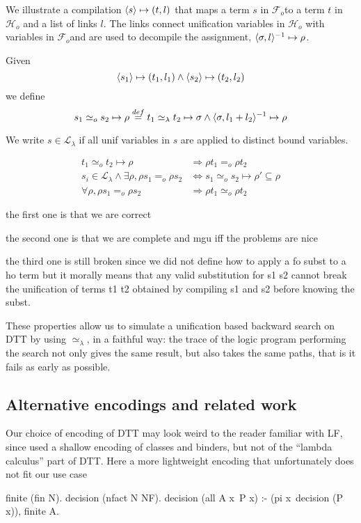 \documentclass[sigconf,natbib=false]{acmart}
\newcommand{\EqualRel}{\ensuremath{=}}
\newcommand{\UnifRel}{\ensuremath{\simeq}}
\newcommand{\Uo}{\ensuremath{\UnifRel_o}\xspace}
\newcommand{\Eo}{\ensuremath{\EqualRel_o}\xspace}
\newcommand{\Ue}{\ensuremath{\UnifRel_\lambda}\xspace}
\newcommand{\Fo}{\ensuremath{\mathcal{F}_{\!o}\xspace}} %
\newcommand{\Ho}{\ensuremath{\mathcal{H}_o}\xspace}
\begin{document}
We illustrate a compilation $\langle s \rangle\mapsto(t,l)$ that
maps a term $s$ in \Fo to a term $t$ in \Ho and a list of links $l$.
The links connect unification variables in \Ho with variables
in \Fo and are used to decompile the assignment,
$\langle \sigma,l \rangle^{-1}\mapsto \rho$.

Given 
$$
\langle s_1 \rangle\mapsto(t_1,l_1) \land \langle s_2 \rangle\mapsto(t_2,l_2)
$$
we define
$$
s_1 \Uo s_2 \mapsto \rho \stackrel{def}{=}
    t_1 \Ue t_2 \mapsto \sigma \land
    \D{\sigma}{l_1 + l_2}{\rho}
$$

We write $s \in \mathcal{L}_\lambda$ if all unif variables in
$s$ are applied to distinct bound variables.

\begin{align}
t_1 \Uo t_2 \mapsto \rho &\Rightarrow \rho t_1 \Eo \rho t_2\\
s_i \in \mathcal{L}_\lambda \land \exists \rho, \rho s_1 \Eo \rho s_2 &\Leftrightarrow s_1 \Uo s_2 \mapsto \rho' \subseteq \rho \\
\forall \rho, \rho s_1 \Eo \rho s_2 &\Rightarrow \rho t_1 \Uo \rho t_2
\end{align}

the first one is that we are correct

the second one is that we are complete and mgu iff the problems are nice

the third one is still broken since we did not define how
to apply a fo subst to a ho term but it morally means
that any valid substitution for s1 s2 cannot break
the unification of terms t1 t2 obtained by compiling
s1 and s2 before knowing the subst.

These properties allow us to simulate a unification based
backward search on DTT by using \Ue, in a faithful way:
the trace of the logic program
performing the search not only gives the same result, but
also takes the same paths, that is it fails as early as possible.


\subsection{Alternative encodings and related work}


Our choice of encoding of DTT may look weird to the reader familiar with
LF, since used a shallow encoding of classes and binders, but not of the
``lambda calculus'' part of DTT. Here a more lightweight encoding
that unfortunately does not fit our use case

\begin{elpicode}
finite (fin N).
decision (nfact N NF).
decision (all A x\ P x) :- 
  (pi x\ decision (P x)), finite A.
\end{elpicode}
\end{document}
